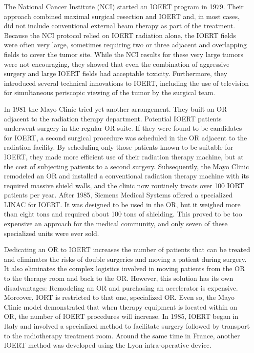 The National Cancer Institute (NCI) started an IOERT program in 1979.
Their approach combined maximal surgical resection and IOERT and, in
most cases, did not include conventional external beam therapy as part
of the treatment. Because the NCI protocol relied on IOERT radiation
alone, the IOERT fields were often very large, sometimes requiring two
or three adjacent and overlapping fields to cover the tumor site. While
the NCI results for these very large tumors were not encouraging, they
showed that even the combination of aggressive surgery and large IOERT
fields had acceptable toxicity. Furthermore, they introduced several
technical innovations to IOERT, including the use of television for
simultaneous periscopic viewing of the tumor by the surgical team.

In 1981 the Mayo Clinic tried yet another arrangement. They built an OR
adjacent to the radiation therapy department. Potential IOERT patients
underwent surgery in the regular OR suite. If they were found to be
candidates for IOERT, a second surgical procedure was scheduled in the
OR adjacent to the radiation facility. By scheduling only those patients
known to be suitable for IOERT, they made more efficient use of their
radiation therapy machine, but at the cost of subjecting patients to a
second surgery. Subsequently, the Mayo Clinic remodeled an OR and
installed a conventional radiation therapy machine with its required
massive shield walls, and the clinic now routinely treats over 100 IORT
patients per year. After 1985, Siemens Medical Systems offered a
specialized LINAC for IOERT. It was designed to be used in the OR, but
it weighed more than eight tons and required about 100 tons of
shielding. This proved to be too expensive an approach for the medical
community, and only seven of these specialized units were ever sold.

Dedicating an OR to IOERT increases the number of patients that can be
treated and eliminates the risks of double surgeries and moving a
patient during surgery. It also eliminates the complex logistics
involved in moving patients from the OR to the therapy room and back to
the OR. However, this solution has its own disadvantages: Remodeling an
OR and purchasing an accelerator is expensive. Moreover, IORT is
restricted to that one, specialized OR. Even so, the Mayo Clinic model
demonstrated that when therapy equipment is located within an OR, the
number of IOERT procedures will increase. In 1985, IOERT began in Italy
and involved a specialized method to facilitate surgery followed by
transport to the radiotherapy treatment room. Around the same time in
France, another IOERT method was developed using the Lyon
intra-operative device.

